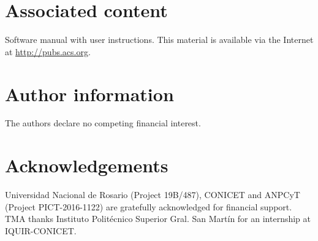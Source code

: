 \documentclass[10pt,twocolumn]{article}
\begin{document}
\section*{Associated content}
Software manual with user instructions.
This material is available via the Internet at \url{http://pubs.acs.org}.

\section*{Author information}
The authors declare no competing financial interest.

\section*{Acknowledgements}
Universidad Nacional de Rosario (Project 19B/487), CONICET and ANPCyT (Project
PICT-2016-1122) are gratefully acknowledged for financial support. TMA thanks
Instituto Polit\'ecnico Superior Gral. San Martín for an internship at
IQUIR-CONICET.

\newpage


\end{document}
